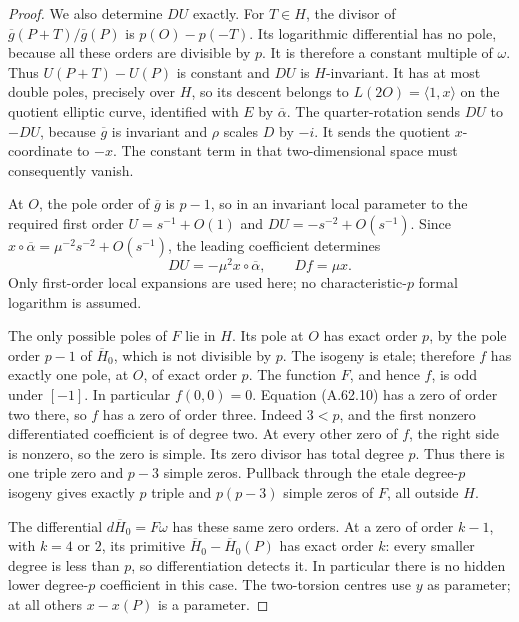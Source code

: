 \begin{proof}
We also determine \(DU\) exactly. For \(T\in H\),
the divisor of \(\overline g(P+T)/\overline g(P)\)
is \(p(O)-p(-T)\). Its logarithmic differential has
no pole, because all these orders are divisible by
\(p\). It is therefore a constant multiple of
\(\omega\). Thus \(U(P+T)-U(P)\) is constant and
\(DU\) is \(H\)-invariant. It has at most double
poles, precisely over \(H\), so its descent belongs
to \(L(2O)=\langle1,x\rangle\) on the quotient elliptic
curve, identified with \(E\) by \(\overline\alpha\).
The quarter-rotation sends \(DU\) to \(-DU\),
because \(\overline g\) is invariant and \(\rho\)
scales \(D\) by \(-i\). It sends the quotient
\(x\)-coordinate to \(-x\). The constant term in
that two-dimensional space must consequently vanish.

At \(O\), the pole order of \(\overline g\) is
\(p-1\), so in an invariant local parameter to
the required first order \(U=s^{-1}+O(1)\) and
\(DU=-s^{-2}+O(s^{-1})\). Since
\(x\circ\overline\alpha=\mu^{-2}s^{-2}+O(s^{-1})\),
the leading coefficient determines
\[
       DU=-\mu^2x\circ\overline\alpha,
          \qquad Df=\mu x.                           \tag{A.62.10}
\]
Only first-order local expansions are used here;
no characteristic-\(p\) formal logarithm is assumed.

The only possible poles of \(F\) lie in \(H\).
Its pole at \(O\) has exact order \(p\), by the
pole order \(p-1\) of \(\overline H_0\), which is
not divisible by \(p\). The isogeny is etale;
therefore \(f\) has exactly one pole, at \(O\),
of exact order \(p\). The function \(F\), and
hence \(f\), is odd under \([-1]\).
In particular \(f(0,0)=0\). Equation (A.62.10)
has a zero of order two there, so \(f\) has a
zero of order three. Indeed \(3<p\), and the
first nonzero differentiated coefficient is of
degree two. At every other zero of \(f\), the
right side is nonzero, so the zero is simple.
Its zero divisor has total degree \(p\). Thus
there is one triple zero and \(p-3\) simple zeros.
Pullback through the etale degree-\(p\) isogeny gives
exactly \(p\) triple and \(p(p-3)\) simple zeros
of \(F\), all outside \(H\).

The differential \(d\overline H_0=F\omega\)
has these same zero orders. At a zero of order
\(k-1\), with \(k=4\) or \(2\), its primitive
\(\overline H_0-\overline H_0(P)\) has exact
order \(k\): every smaller degree is less than
\(p\), so differentiation detects it. In particular
there is no hidden lower degree-\(p\) coefficient
in this case. The two-torsion centres use \(y\)
as parameter; at all others \(x-x(P)\) is a parameter.


\end{proof}
